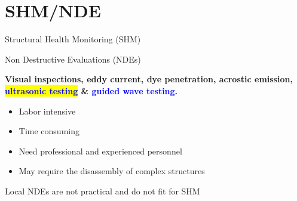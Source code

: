 \documentclass[10pt,aspectratio=169]{beamer} %
\begin{document}
\section{SHM/NDE}
\begin{frame}{Structural Health Monitoring (SHM)}
\end{frame}
\begin{frame}{Non Destructive Evaluations (NDEs)}
	\begin{minipage}[c]{0.3\textwidth}
		\textbf{Visual inspections, eddy current, dye penetration, acrostic emission, \colorbox{yellow}{\textcolor{blue}{ultrasonic testing}} \& \textcolor{blue}{guided wave testing}.}
	\end{minipage}
	\hfill
	\begin{minipage}[c]{0.3\textwidth}
	\end{minipage}	
	\hfill
	\begin{minipage}[c]{0.35\textwidth}
		\begin{itemize}
			\item Labor intensive
			\item Time consuming
			\item Need professional and experienced personnel
			\item May require the disassembly of complex structures
		\end{itemize}
	Local NDEs are not practical and do not fit for SHM
	\end{minipage}
\end{frame}
\end{document}

